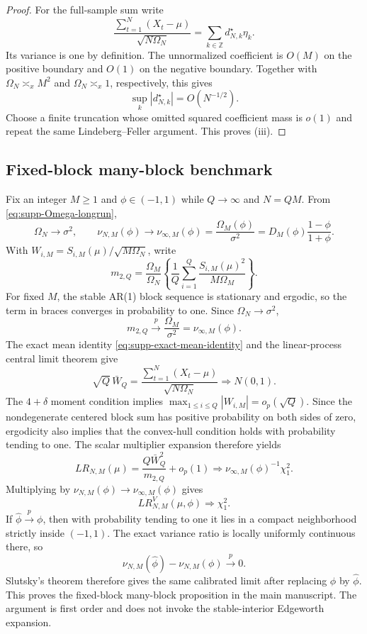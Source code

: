 \documentclass[12pt]{article}
\theoremstyle{remark}
\begin{document}
\begin{proof}
For the full-sample sum write
\[
\frac{\sum_{t=1}^N(X_t-\mu)}{\sqrt{N\Omega_N}}
=
\sum_{k\in\mathbb Z}d_{N,k}^\star\eta_k.
\]
Its variance is one by definition. The unnormalized coefficient is
$O(M)$ on the positive boundary and $O(1)$ on the negative boundary.
Together with $\Omega_N\asymp_x M^2$ and
$\Omega_N\asymp_x1$, respectively, this gives
\[
\sup_k|d_{N,k}^\star|=O(N^{-1/2}).
\]
Choose a finite truncation whose omitted squared coefficient mass is
$o(1)$ and repeat the same Lindeberg--Feller argument. This proves
(iii).
\end{proof}

\subsection{Fixed-block many-block benchmark}
Fix an integer $M\ge1$ and $\phi\in(-1,1)$ while $Q\to\infty$ and
$N=QM$. From \eqref{eq:supp-Omega-longrun},
\[
\Omega_N\longrightarrow\sigma^2,
\qquad
\nu_{N,M}(\phi)
\longrightarrow
\nu_{\infty,M}(\phi)
=\frac{\Omega_M(\phi)}{\sigma^2}
=D_M(\phi)\frac{1-\phi}{1+\phi}.
\]
With $W_{i,M}=S_{i,M}(\mu)/\sqrt{M\Omega_N}$, write
\[
m_{2,Q}
=\frac{\Omega_M}{\Omega_N}
\left\{\frac1Q\sum_{i=1}^Q
\frac{S_{i,M}(\mu)^2}{M\Omega_M}\right\}.
\]
For fixed $M$, the stable AR(1) block sequence is stationary and ergodic, so the term in braces converges in probability to one. Since $\Omega_N\to\sigma^2$,
\[
m_{2,Q}\xrightarrow{p}
\frac{\Omega_M}{\sigma^2}
=\nu_{\infty,M}(\phi).
\]
The exact mean identity \eqref{eq:supp-exact-mean-identity} and the linear-process
central limit theorem give
\[
\sqrt Q\,\bar W_Q
=\frac{\sum_{t=1}^N(X_t-\mu)}{\sqrt{N\Omega_N}}
\Rightarrow N(0,1).
\]
The $4+\delta$ moment condition implies
$\max_{1\le i\le Q}|W_{i,M}|=o_p(\sqrt Q)$. Since the nondegenerate centered
block sum has positive probability on both sides of zero, ergodicity also
implies that the convex-hull condition holds with probability tending to one.
The scalar multiplier expansion therefore yields
\[
LR_{N,M}(\mu)
=\frac{Q\bar W_Q^2}{m_{2,Q}}+o_p(1)
\Rightarrow\nu_{\infty,M}(\phi)^{-1}\chi_1^2.
\]
Multiplying by
$\nu_{N,M}(\phi)\to\nu_{\infty,M}(\phi)$ gives
\[
LR^V_{N,M}(\mu,\phi)\Rightarrow\chi_1^2.
\]
If $\widehat\phi\xrightarrow{p}\phi$, then with probability tending to one it lies in a compact neighborhood strictly inside $(-1,1)$. The exact variance ratio is locally uniformly continuous there, so
\[
\nu_{N,M}(\widehat\phi)-\nu_{N,M}(\phi)\xrightarrow{p}0.
\]
Slutsky's theorem therefore gives the same calibrated limit after replacing $\phi$ by $\widehat\phi$. This proves the fixed-block many-block proposition in the main manuscript.
The argument is first order and does not invoke the stable-interior Edgeworth
expansion.
\end{document}

